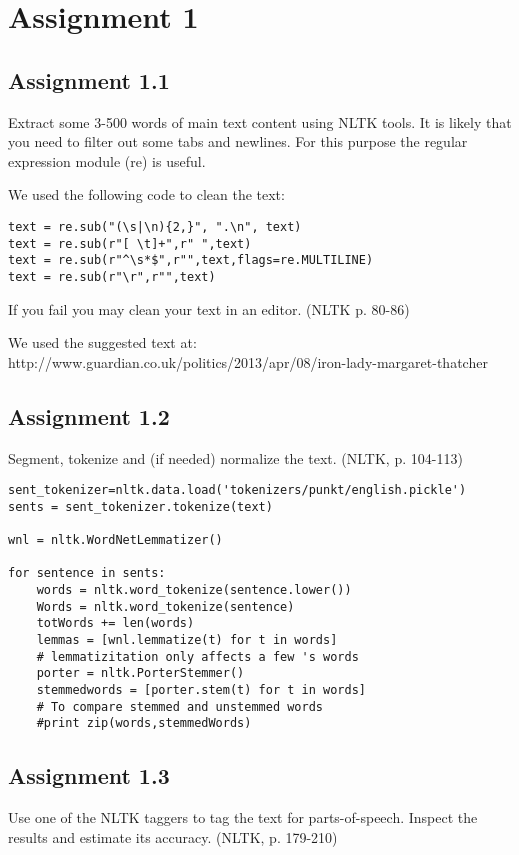 \documentclass[a4paper]{article}
\begin{document}
\section{Assignment 1}

\subsection{Assignment 1.1}
Extract some 3-500 words of main text content using NLTK tools. It is likely that you need to
filter out some tabs and newlines. For this purpose the regular expression module (re) is
useful. 

We used the following code to clean the text:
\begin{verbatim}
text = re.sub("(\s|\n){2,}", ".\n", text)
text = re.sub(r"[ \t]+",r" ",text)
text = re.sub(r"^\s*$",r"",text,flags=re.MULTILINE)
text = re.sub(r"\r",r"",text)
\end{verbatim} 

If you fail you may clean your text in an editor. (NLTK p. 80-86)

We used the suggested text at:
http://www.guardian.co.uk/politics/2013/apr/08/iron-lady-margaret-thatcher


\subsection{Assignment 1.2}
Segment, tokenize and (if needed) normalize the text. (NLTK, p. 104-113)


\begin{verbatim}
sent_tokenizer=nltk.data.load('tokenizers/punkt/english.pickle')
sents = sent_tokenizer.tokenize(text)

wnl = nltk.WordNetLemmatizer()

for sentence in sents:
    words = nltk.word_tokenize(sentence.lower())
    Words = nltk.word_tokenize(sentence)
    totWords += len(words)
    lemmas = [wnl.lemmatize(t) for t in words]
    # lemmatizitation only affects a few 's words
    porter = nltk.PorterStemmer()
    stemmedwords = [porter.stem(t) for t in words]
    # To compare stemmed and unstemmed words
    #print zip(words,stemmedWords)
\end{verbatim} 

\subsection{Assignment 1.3}
Use one of the NLTK taggers to tag the text for parts-of-speech. Inspect the results and estimate its accuracy. (NLTK, p. 179-210)
\end{document}
